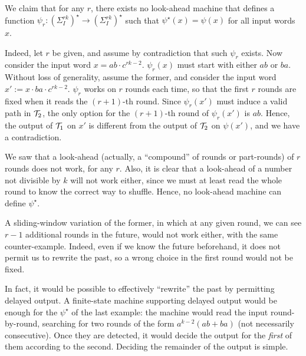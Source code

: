 \begin{example}
We claim that for any $r$, there exists no look-ahead machine that defines a function $\psi_r: (\Sigma_I^{rk})^\star \rightarrow (\Sigma_I^{rk})^\star$ such that $\psi^\star(x)=\psi(x)$ for all input words $x$.

Indeed, let $r$ be given, and assume by contradiction that such $\psi_r$ exists. Now consider the input word $x=ab\cdot c^{rk-2}$. $\psi_r(x)$ must start with either $ab$ or $ba$. Without loss of generality, assume the former, and consider the input word $x':=x\cdot ba\cdot c^{rk-2}$. $\psi_r$ works on $r$ rounds each time, so that the first $r$ rounds are fixed when it reads the $(r+1)$-th round. Since $\psi_r(x')$ must induce a valid path in $\mathcal{T}_2$, the only option for the $(r+1)$-th round of $\psi_r(x')$ is $ab$. Hence, the output of $\mathcal{T}_1$ on $x'$ is different from the output of $\mathcal{T}_2$ on $\psi(x')$, and we have a contradiction.
\end{example}



We saw that a look-ahead (actually, a ``compound'' of rounds or part-rounds) of $r$ rounds does not work, for any $r$. Also, it is clear that a look-ahead of a number not divisible by $k$ will not work either, since we must at least read the whole round to know the correct way to shuffle. Hence, no look-ahead machine can define $\psi^\star$.

A sliding-window variation of the former, in which at any given round, we can see $r-1$ additional rounds in the future, would not work either, with the same counter-example. Indeed, even if we know the future beforehand, it does not permit us to rewrite the past, so a wrong choice in the first round would not be fixed.

In fact, it would be possible to effectively ``rewrite'' the past by permitting delayed output. A finite-state machine supporting delayed output would be enough for the $\psi^\star$ of the last example: the machine would read the input round-by-round, searching for two rounds of the form $a^{k-2}\left(ab+ba\right)$ (not necessarily consecutive). Once they are detected, it would decide the output for the \emph{first} of them according to the second. Deciding the remainder of the output is simple.

